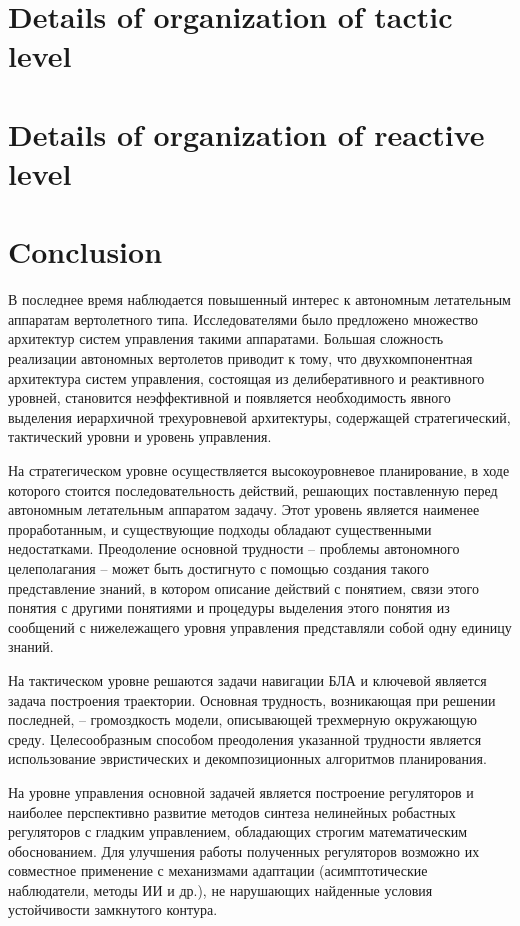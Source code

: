 \documentclass{svjour3}                     %
\begin{document}
\section{Details of organization of tactic level}
\label{sec:4}

\section{Details of organization of reactive level}
\label{sec:5}

\section{Conclusion}
В последнее время наблюдается повышенный интерес к автономным летательным аппаратам вертолетного типа. Исследователями было предложено множество архитектур систем управления такими аппаратами. Большая сложность реализации автономных вертолетов приводит к тому, что двухкомпонентная архитектура систем управления, состоящая из делиберативного и реактивного уровней, становится неэффективной и появляется необходимость явного выделения иерархичной трехуровневой архитектуры, содержащей стратегический, тактический уровни и уровень управления. 

На стратегическом уровне осуществляется высокоуровневое планирование, в ходе которого стоится последовательность действий, решающих поставленную перед автономным летательным аппаратом задачу. Этот уровень является наименее проработанным, и существующие подходы обладают существенными недостатками. Преодоление основной трудности – проблемы автономного целеполагания – может быть достигнуто с помощью создания такого представление знаний, в котором описание действий с понятием, связи этого понятия с другими понятиями и процедуры выделения этого понятия из сообщений с нижележащего уровня управления представляли собой одну единицу знаний.

На тактическом уровне решаются задачи навигации БЛА и ключевой является задача построения траектории. Основная трудность, возникающая при решении последней, – громоздкость модели, описывающей трехмерную окружающую среду. Целесообразным способом преодоления указанной трудности является использование эвристических и декомпозиционных алгоритмов планирования.

На уровне управления основной задачей является построение регуляторов и наиболее перспективно развитие методов синтеза нелинейных робастных регуляторов с гладким управлением, обладающих строгим математическим обоснованием. Для улучшения работы полученных регуляторов возможно их совместное применение с механизмами адаптации (асимптотические наблюдатели, методы ИИ и др.), не нарушающих найденные условия устойчивости замкнутого контура. 
\end{document}
